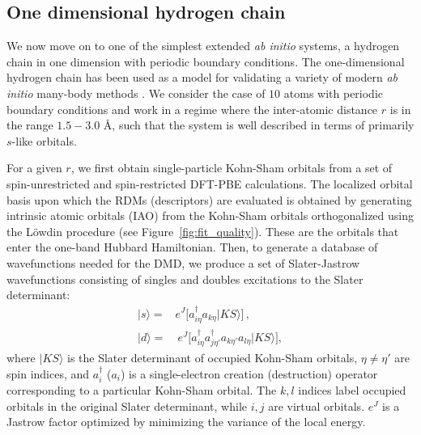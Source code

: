 \documentclass[aps, prb, 11pt]{revtex4-1}
\begin{document}
 
\subsection{One dimensional hydrogen chain}
\label{subsection:1dhydrogen}
We now move on to one of the simplest extended \emph{ab initio} systems, a hydrogen chain in one dimension with periodic boundary conditions. The one-dimensional hydrogen chain has been used as a model for validating a variety of modern \textit{ab initio} many-body methods \cite{H10_Simons}. 
We consider the case of $10$ atoms with periodic boundary conditions and work in a regime where the inter-atomic distance $r$ is in the range $1.5 - 3.0$ \AA, such that the system is  well described in terms of primarily $s$-like orbitals. 

For a given $r$, we first obtain single-particle Kohn-Sham orbitals from a set of spin-unrestricted and 
spin-restricted DFT-PBE calculations. The localized orbital basis upon which the RDMs (descriptors) 
are evaluated is obtained by generating intrinsic atomic orbitals (IAO) \cite{knizia_intrinsic_2013} from the Kohn-Sham orbitals 
orthogonalized using the L\"owdin procedure (see Figure~\ref{fig:fit_quality}). These are the orbitals that enter the one-band Hubbard Hamiltonian. 
Then, to generate a database of wavefunctions needed for the DMD, we produce a set of Slater-Jastrow 
wavefunctions consisting of singles and doubles excitations to the Slater determinant:
\begin{subequations}
\begin{eqnarray}
| s \rangle = & e^J \Big[a^\dagger_{i \eta} a_{k \eta}   | KS \rangle \Big] \,,\\
| d \rangle = & \: e^J \Big[a^\dagger_{i \eta} a^\dagger_{j \eta'} a_{k \eta'} a_{l \eta}   | KS \rangle\Big] ,
\end{eqnarray}
\end{subequations}
where $|KS\rangle$ is the Slater determinant of occupied Kohn-Sham orbitals, $\eta \neq \eta'$ are spin indices, 
and $a_{i}^\dagger$ ($a_{i}$) is a single-electron creation (destruction) operator corresponding to a particular Kohn-Sham orbital. The $k,l$ indices label occupied orbitals in the original Slater determinant, while $i,j$ are virtual orbitals. 
$e^J$ is a Jastrow factor optimized by minimizing the variance of the local energy. 
\end{document}
